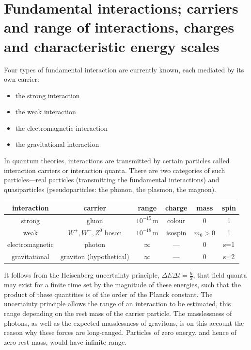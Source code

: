 \section{Fundamental interactions; carriers and range of interactions, charges and characteristic energy scales}

Four types of fundamental interaction are currently known, each mediated by its own carrier:

\begin{itemize}
    \item the strong interaction
    \item the weak interaction
    \item the electromagnetic interaction
    \item the gravitational interaction
\end{itemize}

In quantum theories, interactions are transmitted by certain particles called interaction carriers or interaction quanta. There are two categories of such particles---real particles (transmitting the fundamental interactions) and quasiparticles (pseudoparticles: the phonon, the plasmon, the magnon).

\begin{table}[h!]
\centering
\begin{tabular}{|c|c|c|c|c|c|}
\hline
interaction & carrier & range & charge & mass & spin \\
\hline
strong & gluon & $10^{-15}$\,m & colour & 0 & 1 \\
\hline
weak & $W^+, W^-, Z^0$ boson & $10^{-18}$\,m & isospin & $m_0>0$ & 1 \\
\hline
electromagnetic & photon & $\infty$ & --- & 0 & s=1 \\
\hline
gravitational & graviton (hypothetical) & $\infty$ & --- & 0 & s=2 \\
\hline
\end{tabular}
\end{table}

It follows from the Heisenberg uncertainty principle, $\Delta E \Delta t = \frac{\hbar}{2}$\merr, that field quanta may exist for a finite time set by the magnitude of these energies, such that the product of these quantities is of the order of the Planck constant. The uncertainty principle allows the range of an interaction to be estimated, this range depending on the rest mass of the carrier particle. The masslessness of photons, as well as the expected masslessness of gravitons, is on this account the reason why these forces are long-ranged. %
Particles of zero energy, and hence of zero rest mass, would have infinite range.\merr

